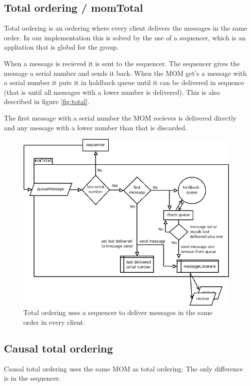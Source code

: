\documentclass[english]{article}
\begin{document}
\subsection{Total ordering / momTotal}
\label{mo-total}
Total ordering is an ordering where every client delivers the messages in the same order. In our implementation this is solved by the use of a sequencer, which is an appliation that is global for the group. 

When a message is recieved it is sent to the sequencer. The sequencer gives the message a serial number and sends it back. When the MOM get's a message with a serial number it puts it in holdback queue until it can be delivered in sequence (that is until all messages with a lower number is delivered). This is also described in figure \vref{fig:total}.

The first message with a serial number the MOM recieves is delivered directly and any message with a lower number than that is discarded.

\begin{figure}
\includegraphics[width=\textwidth]{momTotal.png}
\caption{Total ordering uses a sequencer to deliver messages in the same order in every client.}
\label{fig:total}
\end{figure}

\subsection{Causal total ordering}
Causal total ordering uses the same MOM as total ordering. The only difference is in the sequencer.
\end{document}
